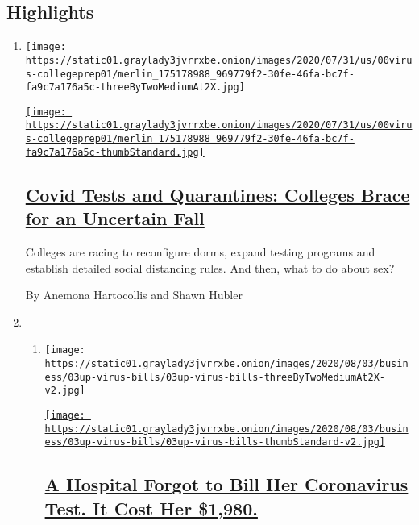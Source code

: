 \hypertarget{highlights}{%
\subsection{Highlights}\label{highlights}}

\begin{enumerate}
\def\labelenumi{\arabic{enumi}.}
\item
  \texttt{[image: https://static01.graylady3jvrrxbe.onion/images/2020/07/31/us/00virus-collegeprep01/merlin\_175178988\_969779f2-30fe-46fa-bc7f-fa9c7a176a5c-threeByTwoMediumAt2X.jpg]}

  \href{/2020/08/02/us/covid-college-reopening.html}{\texttt{[image: https://static01.graylady3jvrrxbe.onion/images/2020/07/31/us/00virus-collegeprep01/merlin\_175178988\_969779f2-30fe-46fa-bc7f-fa9c7a176a5c-thumbStandard.jpg]}}

  \hypertarget{covid-tests-and-quarantines-colleges-brace-for-an-uncertain-fall}{%
  \subsection{\texorpdfstring{\href{/2020/08/02/us/covid-college-reopening.html}{Covid
  Tests and Quarantines: Colleges Brace for an Uncertain
  Fall}}{Covid Tests and Quarantines: Colleges Brace for an Uncertain Fall}}\label{covid-tests-and-quarantines-colleges-brace-for-an-uncertain-fall}}

  Colleges are racing to reconfigure dorms, expand testing programs and
  establish detailed social distancing rules. And then, what to do about
  sex?

  By Anemona Hartocollis and Shawn Hubler
\item
  \begin{enumerate}
  \def\labelenumii{\arabic{enumii}.}
  \item
    \texttt{[image: https://static01.graylady3jvrrxbe.onion/images/2020/08/03/business/03up-virus-bills/03up-virus-bills-threeByTwoMediumAt2X-v2.jpg]}

    \href{/2020/08/03/upshot/nj-coronavirus-medical-bill.html}{\texttt{[image: https://static01.graylady3jvrrxbe.onion/images/2020/08/03/business/03up-virus-bills/03up-virus-bills-thumbStandard-v2.jpg]}}

    \hypertarget{a-hospital-forgot-to-bill-her-coronavirus-test-it-cost-her-1980}{%
    \subsection{\texorpdfstring{\href{/2020/08/03/upshot/nj-coronavirus-medical-bill.html}{A
    Hospital Forgot to Bill Her Coronavirus Test. It Cost Her
    \$1,980.}}{A Hospital Forgot to Bill Her Coronavirus Test. It Cost Her \$1,980.}}\label{a-hospital-forgot-to-bill-her-coronavirus-test-it-cost-her-1980}}


\end{enumerate}
\end{enumerate}
